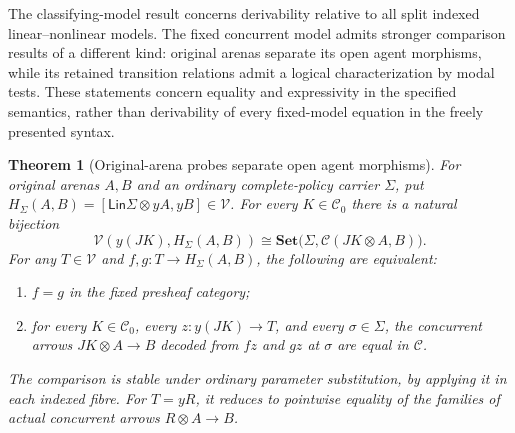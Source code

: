 \documentclass[11pt,a4paper]{article}
\numberwithin{equation}{section}
\newtheorem{theorem}{Theorem}[section]
\theoremstyle{definition}
\theoremstyle{remark}
\theoremstyle{plain}
\providecommand{\Lin}{\mathsf{Lin}}
\providecommand{\cC}{\mathcal{C}}
\providecommand{\cV}{\mathcal{V}}
\providecommand{\Set}{\mathbf{Set}}
\begin{document}
The classifying-model result concerns derivability relative to all split
indexed linear--nonlinear models. The fixed concurrent model admits stronger
comparison results of a different kind: original arenas separate its open
agent morphisms, while its retained transition relations admit a logical
characterization by modal tests. These statements concern equality and
expressivity in the specified semantics, rather than derivability of every
fixed-model equation in the freely presented syntax.

\begin{theorem}[Original-arena probes separate open agent morphisms]
\label{thm:agt-concurrent-probe-separation}
For original arenas $A,B$ and an ordinary complete-policy carrier $\Sigma$,
put $H_\Sigma(A,B)=[\Lin\Sigma\otimes yA,yB]\in\cV$. For every
$K\in\mathcal C_0$ there is a natural bijection
\begin{equation}\label{eq:agt-concurrent-probe}
 \cV(y(JK),H_\Sigma(A,B))
 \cong \Set\bigl(\Sigma,\cC(JK\otimes A,B)\bigr).
\end{equation}
For any $T\in\cV$ and $f,g:T\to H_\Sigma(A,B)$, the following are
equivalent:
\begin{enumerate}[label=\textup{(\roman*)},leftmargin=*]
\item $f=g$ in the fixed presheaf category;
\item for every $K\in\mathcal C_0$, every $z:y(JK)\to T$, and every
$\sigma\in\Sigma$, the concurrent arrows $JK\otimes A\to B$
decoded from $fz$ and $gz$ at $\sigma$ are equal in $\cC$.
\end{enumerate}
The comparison is stable under ordinary parameter substitution, by
applying it in each indexed fibre. For $T=yR$, it reduces to pointwise
equality of the families of actual concurrent arrows $R\otimes A\to B$.
\end{theorem}
\end{document}

